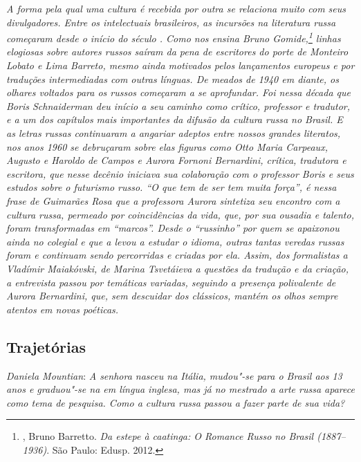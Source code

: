 \emph{A forma pela qual uma cultura é recebida por outra se relaciona
muito com seus divulgadores. Entre os intelectuais brasileiros, as
incursões na literatura russa começaram desde o início do século .
Como nos ensina Bruno Gomide,\footnote{, Bruno Barretto. \emph{Da
  estepe à caatinga: O Romance Russo no Brasil (1887--1936)}. São Paulo:
  Edusp. 2012.} linhas elogiosas sobre autores russos saíram da
pena de escritores do porte de Monteiro Lobato e Lima Barreto, mesmo
ainda motivados pelos lançamentos europeus e por traduções intermediadas
com outras línguas. De meados de 1940 em diante, os olhares voltados
para os russos começaram a se aprofundar. Foi nessa década que Boris
Schnaiderman deu início a seu caminho como crítico, professor e
tradutor, e a um dos capítulos mais importantes da difusão da cultura
russa no Brasil. E as letras russas continuaram a angariar adeptos entre
nossos grandes literatos, nos anos 1960 se debruçaram sobre elas figuras
como Otto Maria Carpeaux, Augusto e Haroldo de Campos e Aurora Fornoni Bernardini, crítica, tradutora e escritora, que nesse decênio iniciava
sua colaboração com o professor Boris e seus estudos sobre o futurismo
russo. ``O que tem de ser tem muita força'', é nessa frase de Guimarães
Rosa que a professora Aurora sintetiza seu encontro com a cultura russa,
permeado por coincidências da vida, que, por sua ousadia e talento,
foram transformadas em ``marcos''. Desde o ``russinho'' por quem se
apaixonou ainda no colegial e que a levou a estudar o idioma, outras
tantas veredas russas foram e continuam sendo percorridas e criadas por
ela. Assim, dos formalistas a Vladímir Maiakóvski, de Marina Tsvetáieva a questões da tradução e da criação, a entrevista passou por temáticas
variadas, seguindo a presença polivalente de Aurora Bernardini, que, sem
descuidar dos clássicos, mantém os olhos sempre atentos em novas
poéticas.} 

\subsection{\uppercase{T}rajetórias}

\noindent
\emph{Daniela Mountian}: \emph{A senhora nasceu na Itália, mudou"-se para o Brasil aos 13 anos e
graduou"-se na  em língua inglesa, mas já no mestrado a arte russa
aparece como tema de pesquisa. Como a cultura russa passou a fazer parte
de sua vida?}

